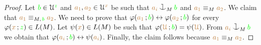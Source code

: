 \begin{proof}
Let ${\gr b}\in\U^{\gr z}$ and ${\mr a_1},{\mr a_2}\in\U^{\mr x}$ be such that ${\mr a_i}\cnonfork_M{\gr b}$ and ${\mr a_1}\equiv_M{\mr a_2}$.
We claim that ${\mr a_1}\equiv_{M,\,{\gr b}}{\mr a_2}$.
We need to prove that $\phi({\mr a_1}\,;{\gr b})\iff\phi({\mr a_2}\,;{\gr b})$ for every  $\phi({\mr x}\,;{\gr z})\in L(M)$.
Let $\psi({\mr x})\in L(M)$ be such that $\phi({\mr\U}\,;{\gr b})=\psi({\mr \U})$.
From ${\mr a_i}\cnonfork_M{\gr b}$ we obtain that  $\phi({\mr a_i}\,;{\gr b})\iff\psi({\mr a_i})$.
Finally, the claim follows because ${\mr a_1}\equiv_M{\mr a_2}$.
\end{proof}



% 



